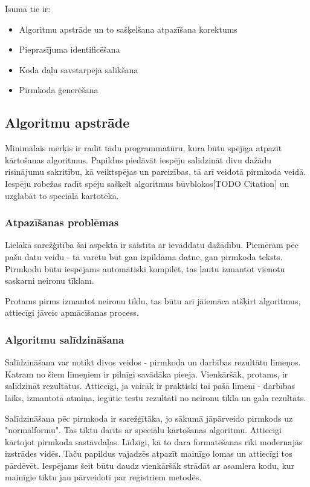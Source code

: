 Īsumā tie ir: 
\begin{itemize}
\item Algoritmu apstrāde un to
\subitem sašķelšana
\subitem atpazīšana
\subitem korektums
\item Pieprasījuma identificēšana
\item Koda daļu savstarpējā salikšana
\item Pirmkoda ģenerēšana
\end{itemize}

\subsection{Algoritmu apstrāde}
Minimālais mērķis ir radīt tādu programmatūru, kura būtu spējīga atpazīt kārtošanas algoritmus. Papildus piedāvāt iespēju salīdzināt divu dažādu risinājumu sakritību, kā veiktspējas un pareizības, tā arī veidotā pirmkoda veidā. Iespēju robežas radīt spēju sašķelt algoritmus būvblokos[TODO Citation] un uzglabāt to speciālā kartotēkā. 

\subsubsection{Atpazīšanas problēmas}
Lielākā sarežģītība šai aspektā ir saistīta ar ievaddatu dažādību. Piemēram pēc pašu datu veidu - tā varētu būt gan izpildāma datne, gan pirmkoda teksts. Pirmkodu būtu iespējams automātiski kompilēt, tas ļautu izmantot vienotu saskarni neironu tīklam. 

Protams pirms izmantot neironu tīklu, tas būtu arī jāiemāca atšķirt algoritmus, attiecīgi jāveic apmācīšanas process.

\subsubsection{Algoritmu salīdzināšana}
Salīdzināšana var notikt divos veidos - pirmkoda un darbības rezultātu līmeņos. Katram no šiem līmeņiem ir pilnīgi savādāka pieeja. Vienkāršāk, protams, ir salīdzināt rezultātus. Attiecīgi, ja vairāk ir praktiski tai pašā līmenī - darbības laiks, izmantotā atmiņa, iegūtie testu rezultāti no neironu tīkla un gala rezultāts.

Salīdzināšana pēc pirmkoda ir sarežģītāka, jo sākumā jāpārveido pirmkods uz "normālformu". Tas tiktu darīts ar speciālu kārtošanas algoritmu. Attiecīgi kārtojot pirmkoda sastāvdaļas. Līdzīgi, kā to dara formatēšanas rīki modernajās izstrādes vidēs. Taču papildus vajadzēs atpazīt mainīgo lomas un attiecīgi tos pārdēvēt. Iespējams šeit būtu daudz vienkāršāk strādāt ar asamlera kodu, kur mainīgie tiktu jau pārveidoti par reģistriem metodēs.


